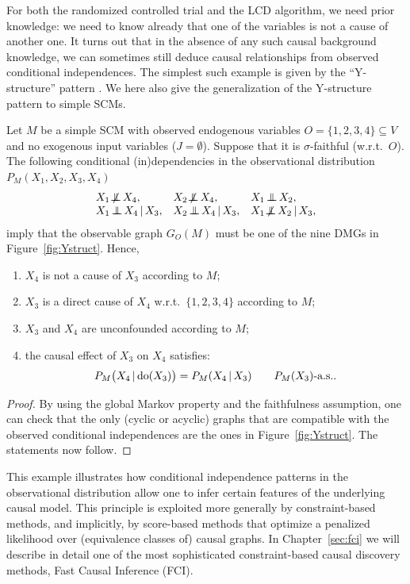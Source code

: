 For both the randomized controlled trial and the LCD algorithm, we need prior knowledge: we need to know already that one of the variables is not a cause of another one. 
It turns out that in the absence of any such causal background knowledge, we can sometimes still deduce causal relationships from observed conditional independences.
The simplest such example is given by the ``Y-structure'' pattern \cite{ManiPhD2006}.
We here also give the generalization of the Y-structure pattern to simple SCMs.
\begin{Prp}\label{prp:y-structures}
  Let $M$ be a simple SCM with observed endogenous variables $O = \{1,2,3,4\} \subseteq V$ and no exogenous input variables ($J = \emptyset$).
  Suppose that it is $\sigma$-faithful (w.r.t.\ $O$). 
  The following conditional (in)dependencies in the observational distribution $P_{M}(X_1,X_2,X_3,X_4)$
  $$\begin{array}{lll}
    X_1 \nIndep X_4,  & X_2 \nIndep X_4, & X_1 \Indep X_2, \\
    X_1 \Indep X_4 \given X_3, & X_2 \Indep X_4 \given X_3, & X_1 \nIndep X_2 \given X_3,
  \end{array}$$
  imply that the observable graph $G_O(M)$ must be one of the nine DMGs in Figure~\ref{fig:Ystruct}.
  Hence,
  \begin{enumerate}
    \item $X_4$ is not a cause of $X_3$ according to $M$;
    \item $X_3$ is a direct cause of $X_4$ w.r.t.\ $\{1,2,3,4\}$ according to $M$;
    \item $X_3$ and $X_4$ are unconfounded according to $M$;
    \item the causal effect of $X_3$ on $X_4$ satisfies:
  \begin{equation}\label{eq:Y_causal_effect}
    P_{M}\big(X_4 \operatorname*{|} \operatorname{do}(X_3)\big) = P_{M}(X_4 \operatorname*{|} X_3) \qquad P_M(X_3)\text{-a.s.}.
  \end{equation}
  \end{enumerate}
\end{Prp}
\begin{proof}
By using the global Markov property and the faithfulness assumption, one
can check that the only (cyclic or acyclic) graphs that are compatible with the observed
conditional independences are the ones in Figure~\ref{fig:Ystruct}.
The statements now follow.
\end{proof}
This example illustrates how conditional independence patterns in the observational
distribution allow one to infer certain features of the underlying causal model. This
principle is exploited more generally by constraint-based methods, and implicitly,
by score-based methods that optimize a penalized likelihood over (equivalence classes of) causal graphs.
In Chapter~\ref{sec:fci} we will describe in detail one of the most sophisticated constraint-based
causal discovery methods, Fast Causal Inference (FCI).


